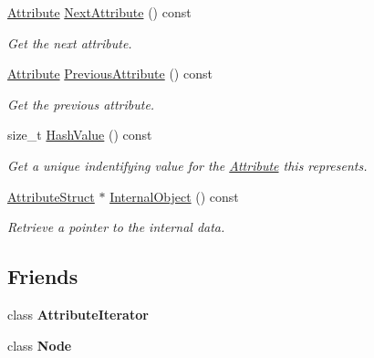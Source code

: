 \begin{DoxyCompactItemize}
\hyperlink{classphys_1_1xml_1_1Attribute}{Attribute} \hyperlink{classphys_1_1xml_1_1Attribute_a58faea36f12b6e57cc6d5891661c4ca9}{NextAttribute} () const 
\begin{DoxyCompactList}\small\item\em Get the next attribute. \item\end{DoxyCompactList}\item 
\hyperlink{classphys_1_1xml_1_1Attribute}{Attribute} \hyperlink{classphys_1_1xml_1_1Attribute_a02fa8a573b2adf5142d363d6eb95e1d5}{PreviousAttribute} () const 
\begin{DoxyCompactList}\small\item\em Get the previous attribute. \item\end{DoxyCompactList}\item 
size\_\-t \hyperlink{classphys_1_1xml_1_1Attribute_ac0c27e07b705c41670a0903f4fe18378}{HashValue} () const 
\begin{DoxyCompactList}\small\item\em Get a unique indentifying value for the \hyperlink{classphys_1_1xml_1_1Attribute}{Attribute} this represents. \item\end{DoxyCompactList}\item 
\hyperlink{structphys_1_1xml_1_1AttributeStruct}{AttributeStruct} $\ast$ \hyperlink{classphys_1_1xml_1_1Attribute_a1354d5f93309a999651e11b1cd4c2f62}{InternalObject} () const 
\begin{DoxyCompactList}\small\item\em Retrieve a pointer to the internal data. \item\end{DoxyCompactList}\end{DoxyCompactItemize}
\subsection*{Friends}
\begin{DoxyCompactItemize}
\item 
\hypertarget{classphys_1_1xml_1_1Attribute_a1ed8790083a80b2604beba1c666bce6e}{
class {\bfseries AttributeIterator}}
\label{da/ddf/classphys_1_1xml_1_1Attribute_a1ed8790083a80b2604beba1c666bce6e}

\item 
\hypertarget{classphys_1_1xml_1_1Attribute_a6db9d28bd448a131448276ee03de1e6d}{
class {\bfseries Node}}
\label{da/ddf/classphys_1_1xml_1_1Attribute_a6db9d28bd448a131448276ee03de1e6d}

\end{DoxyCompactItemize}


